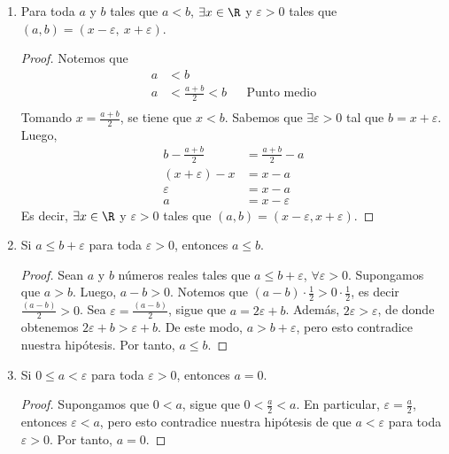 \begin{enumerate}[label=\alph*)]
 \textbf{Nota:} Con esta prueba verificamos que todo número $b$, mayor que $a$, puede escribirse como la suma de $a$ y algún número positivo.
 
  \item Para toda $a$ y $b$ tales que $a<b$, $\exists x\in \R$ y $\varepsilon>0$ tales que $(a, b)= (x- \varepsilon, \ x+\varepsilon)$.
  \begin{proof}\leavevmode
    Notemos que
    \begin{align*}
      a &< b\\
      a &< \frac{a+b}{2} < b && \text{Punto medio}\\
    \end{align*}
    Tomando $x=\frac{a+b}{2}$, se tiene que $x<b$. Sabemos que $\exists \varepsilon>0$ tal que $b=x+\varepsilon$. Luego,
    \begin{align*}
      b-\frac{a+b}{2} &= \frac{a+b}{2}-a\\
      (x+\varepsilon) - x &= x - a\\
      \varepsilon &= x - a\\
      a &= x - \varepsilon
    \end{align*}
    Es decir, $\exists x\in \R$ y $\varepsilon>0$ tales que $(a, b)= (x- \varepsilon, x+\varepsilon)$.
  \end{proof}
    
  \item Si $a \leq b + \varepsilon$ para toda $\varepsilon > 0$, entonces $a \leq b$.
 
  \begin{proof} 
   Sean $a$ y $b$ números reales tales que $a \leq b + \varepsilon$, $\forall \varepsilon > 0$. Supongamos que $a > b$. Luego, $a-b>0$. Notemos que $(a-b) \cdot \frac{1}{2} > 0 \cdot \frac{1}{2}$, es decir $\frac{(a-b)}{2} > 0$. Sea $\varepsilon = \frac{(a-b)}{2}$, sigue que $a=2\varepsilon+b$. Además, $2\varepsilon > \varepsilon$, de donde obtenemos $2 \varepsilon + b > \varepsilon + b$. De este modo, $a > b+\varepsilon$, pero esto contradice nuestra hipótesis. Por tanto, $a \leq b$. 
  \end{proof}
  
 \item Si $0 \leq a < \varepsilon$ para toda $\varepsilon > 0$, entonces $a=0$.
 
 \begin{proof} 
  Supongamos que $0<a$, sigue que $0<\frac{a}{2}<a$. En particular, $\varepsilon=\frac{a}{2}$, entonces $\varepsilon<a$, pero esto contradice nuestra hipótesis de que $a< \varepsilon$ para toda $\varepsilon>0$. Por tanto, $a=0$. 
 \end{proof}


\end{enumerate}
